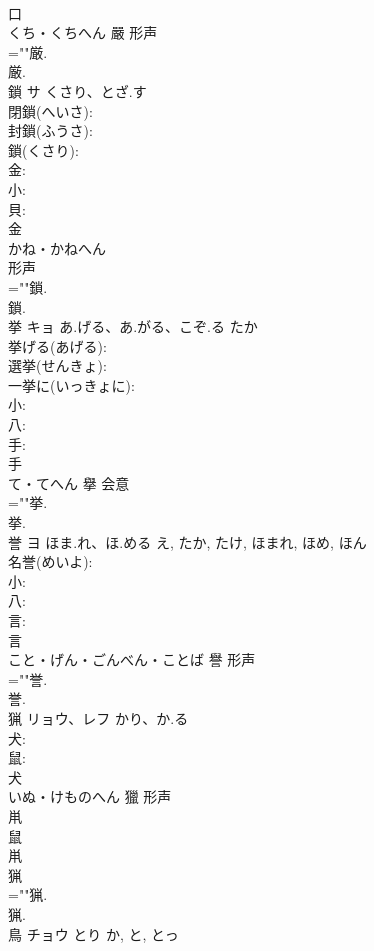 \documentclass[8pt]{extreport}
\begin{document}
\begin{CJK}{UTF8}{min}
\\	口	
\\	くち・くちへん	嚴	形声 
\\	=""厳.
\\	厳.
\\	鎖	サ	くさり、とざ.す		
\\	閉鎖(へいさ): 
\\	封鎖(ふうさ): 
\\	鎖(くさり): 
\\	金: 
\\	小: 
\\	貝: 
\\	金	
\\	かね・かねへん	
\\	形声 
\\	=""鎖.
\\	鎖.
\\	挙	キョ	あ.げる、あ.がる、こぞ.る	たか	
\\	挙げる(あげる): 
\\	選挙(せんきょ): 
\\	一挙に(いっきょに): 
\\	小: 
\\	八: 
\\	手: 
\\	手	
\\	て・てへん	擧	会意 
\\	=""挙.
\\	挙.
\\	誉	ヨ	ほま.れ、ほ.める	え, たか, たけ, ほまれ, ほめ, ほん	
\\	名誉(めいよ): 
\\	小: 
\\	八: 
\\	言: 
\\	言	
\\	こと・げん・ごんべん・ことば	譽	形声 
\\	=""誉.
\\	誉.
\\	猟	リョウ、レフ	かり、か.る		
\\	犬: 
\\	鼠: 
\\	犬	
\\	いぬ・けものへん	獵	形声 
\\	鼡 
\\	鼠 
\\	鼡 
\\	猟 
\\	=""猟.
\\	猟.
\\	鳥	チョウ	とり	か, と, とっ	

\end{CJK}
\end{document}
